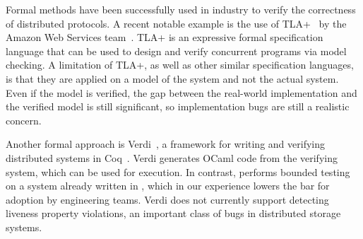 Formal methods have been successfully used in industry to verify the correctness of distributed protocols. A recent notable example is the use of TLA+~\cite{lamport1994temporal} by the Amazon Web Services team~\cite{newcombe2015aws}. TLA+ is an expressive formal specification language that can be used to design and verify concurrent programs via model checking. A limitation of TLA+, as well as other similar specification languages, is that they are applied on a model of the system and not the actual system. Even if the model is verified, the gap between the real-world implementation and the verified model is still significant, so implementation bugs are still a realistic concern.

Another formal approach is Verdi~\cite{wilcox2015verdi}, a framework for writing and verifying distributed systems in Coq~\cite{barras1997coq}. Verdi generates OCaml code from the verifying system, which can be used for execution. In contrast, \psharp performs bounded testing on a system already written in \csharp, which in our experience lowers the bar for adoption by engineering teams. Verdi does not currently support detecting liveness property violations, an important class of bugs in distributed storage systems.
